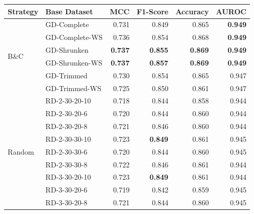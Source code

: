 \begin{table}[ht]
	\centering
	\small
	\begin{tabular}{llrrrr}
		\toprule
		Strategy                    & Base Dataset   & MCC            & F1-Score       & Accuracy       & AUROC          \\
		\midrule
		\multirow[t]{6}{*}{B\&C}    & GD-Complete    & 0.731          & 0.849          & 0.865          & \textbf{0.949} \\
		                            & GD-Complete-WS & 0.736          & 0.854          & 0.868          & \textbf{0.949} \\
		                            & GD-Shrunken    & \textbf{0.737} & \textbf{0.855} & \textbf{0.869} & \textbf{0.949} \\
		                            & GD-Shrunken-WS & \textbf{0.737} & \textbf{0.857} & \textbf{0.869} & \textbf{0.949} \\
		                            & GD-Trimmed     & 0.730          & 0.854          & 0.865          & 0.947          \\
		                            & GD-Trimmed-WS  & 0.725          & 0.850          & 0.861          & 0.947          \\
		\midrule
		\multirow[t]{21}{*}{Random} & RD-2-30-20-10  & 0.718          & 0.844          & 0.858          & 0.944          \\
		                            & RD-2-30-20-6   & 0.720          & 0.844          & 0.860          & 0.944          \\
		                            & RD-2-30-20-8   & 0.721          & 0.846          & 0.860          & 0.944          \\
		                            & RD-2-30-30-10  & 0.723          & \textbf{0.849} & 0.861          & 0.945          \\
		                            & RD-2-30-30-6   & 0.720          & 0.844          & 0.860          & 0.945          \\
		                            & RD-2-30-30-8   & 0.722          & 0.846          & 0.861          & 0.944          \\
		                            & RD-3-30-20-10  & 0.723          & \textbf{0.849} & 0.861          & 0.944          \\
		                            & RD-3-30-20-6   & 0.719          & 0.842          & 0.859          & 0.945          \\
		                            & RD-3-30-20-8   & 0.721          & 0.844          & 0.860          & 0.945          \\

\end{tabular}
\end{table}
